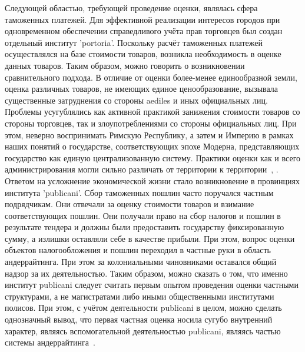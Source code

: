 \documentclass[12pt]{scrartcl}
\begin{document}
Следующей областью, требующей проведение оценки, являлась сфера таможенных платежей. Для эффективной реализации интересов городов при одновременном обеспечении справедливого учёта прав торговцев был создан отдельный институт 'portoria'. Поскольку расчёт таможенных платежей осуществлялся на базе стоимости товаров, возникла необходимость в оценке данных товаров. Таким образом, можно говорить о возникновении сравнительного подхода. В отличие от оценки более-менее единообразной земли, оценка различных товаров, не имеющих единое ценообразование, вызывала существенные затруднения со стороны aediles и иных официальных лиц. Проблемы усугублялись как активной практикой занижения стоимости товаров со стороны торговцев, так и злоупотреблениями со стороны официальных лиц. При этом, неверно воспринимать Римскую Республику, а затем и Империю в рамках наших понятий о государстве, соответствующих эпохе Модерна, представляющих государство как единую централизованную систему. Практики оценки как и всего администрирования могли сильно различать от территории к территории~\cite{Oleson2008}, \cite{Sidebotham1986}. Ответом на усложнение экономической жизни стало возникновение в провинциях института 'publicani'. Сбор таможенных пошлин часто поручался частным подрядчикам. Они отвечали за оценку стоимости товаров и взимание соответствующих пошлин. Они получали право на сбор налогов и пошлин в результате тендера и должны были предоставить государству фиксированную сумму, а излишки оставляли себе в качестве прибыли. При этом, вопрос оценки объектов налогообложения и пошлин переходил в частные руки в область андеррайтинга. При этом за колониальными чиновниками оставался общий надзор за их деятельностью. Таким образом, можно сказать о том, что именно институт publicani следует считать первым опытом проведения оценки частными структурами, а не магистратами либо иными общественными институтами полисов. При этом, с учётом деятельности publicani в целом, можно сделать однозначный вывод, что первая частная оценка носила сугубо внутренний характер, являясь вспомогательной деятельностью publicani, являясь частью системы андеррайтинга~\cite{Weaver2008}.
\end{document}
